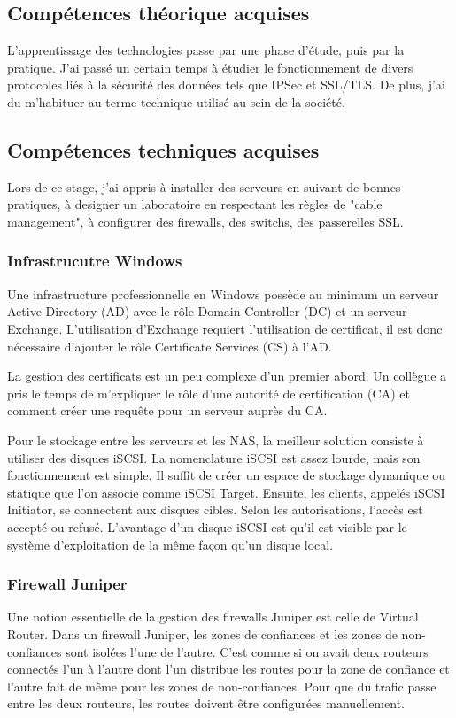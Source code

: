 \subsection{Compétences théorique acquises}
L'apprentissage des technologies passe par une phase d'étude, puis par la pratique.
J'ai passé un certain temps à étudier le fonctionnement de divers protocoles liés à la sécurité des données tels que IPSec et SSL/TLS.
De plus, j'ai du m'habituer au terme technique utilisé au sein de la société.

\subsection{Compétences techniques acquises}
Lors de ce stage, j'ai appris à installer des serveurs en suivant de bonnes pratiques, à designer un laboratoire en respectant les règles de "cable management", à configurer des firewalls, des switchs, des passerelles SSL. 
\subsubsection{Infrastrucutre Windows}
Une infrastructure professionnelle en Windows possède au minimum un serveur Active Directory (AD) avec le rôle Domain Controller (DC) et un serveur Exchange. 
L'utilisation d'Exchange requiert l'utilisation de certificat, il est donc nécessaire d'ajouter le rôle Certificate Services (CS) à l'AD.

La gestion des certificats est un peu complexe d'un premier abord.
Un collègue a pris le temps de m'expliquer le rôle d'une autorité de certification (CA) et comment créer une requête pour un serveur auprès du CA. 

Pour le stockage entre les serveurs et les NAS, la meilleur solution consiste à utiliser des disques iSCSI.
La nomenclature iSCSI est assez lourde, mais son fonctionnement est simple. 
Il suffit de créer un espace de stockage dynamique ou statique que l'on associe comme iSCSI Target. 
Ensuite, les clients, appelés iSCSI Initiator, se connectent aux disques cibles. 
Selon les autorisations, l'accès est accepté ou refusé.
L'avantage d'un disque iSCSI est qu'il est visible par le système d'exploitation de la même façon qu'un disque local. 

\subsubsection{Firewall Juniper}
Une notion essentielle de la gestion des firewalls Juniper est celle de Virtual Router.
Dans un firewall Juniper, les zones de confiances et les zones de non-confiances sont isolées l'une de l'autre.
C'est comme si on avait deux routeurs connectés l'un à l'autre dont l'un distribue les routes pour la zone de confiance et l'autre fait de même pour les zones de non-confiances.
Pour que du trafic passe entre les deux routeurs, les routes doivent être configurées manuellement.

